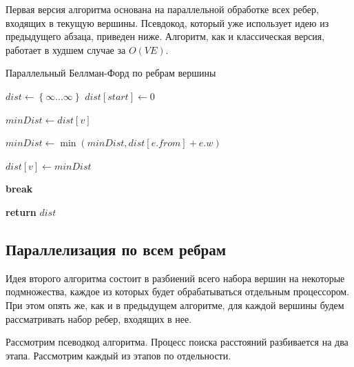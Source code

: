 Первая версия алгоритма основана на параллельной обработке всех ребер, входящих в текущую вершины. Псевдокод, который уже использует идею из предыдущего абзаца, приведен ниже. Алгоритм, как и классическая версия, работает в худшем случае за $O(VE)$. 



\FloatBarrier
\begin{algorithm}
\caption{Параллельный Беллман-Форд по ребрам вершины}\label{bf_classic_par1}
\begin{algorithmic}[1]
\State $dist\gets \left\{ {\infty ... \infty}\right\}$
\State $dist[start] \gets 0$
 
		\algrenewcommand{}
		\State $minDist \gets dist[v]$

		  
			\State $minDist \gets \min(minDist, dist[e.from] + e.w)$
		\EndFor	
					
			\State $dist[v] \gets minDist$  

		\EndIf

		\algrenewcommand{}

	\EndFor
		\State \textbf{break}
	\EndIf

\EndFor
\State \textbf{return} $dist$
\EndProcedure
\end{algorithmic}
\end{algorithm}
\FloatBarrier



\FloatBarrier
\subsection{Параллелизация по всем ребрам}
Идея второго алгоритма состоит в разбиений всего набора вершин на некоторые подмножества, каждое из которых будет обрабатываться отдельным процессором. При этом опять же, как и в предыдущем алгоритме, для каждой вершины будем рассматривать набор ребер, входящих в нее. 

Рассмотрим псеводкод алгоритма. Процесс поиска расстояний разбивается на два этапа. Рассмотрим каждый из этапов по отдельности.

